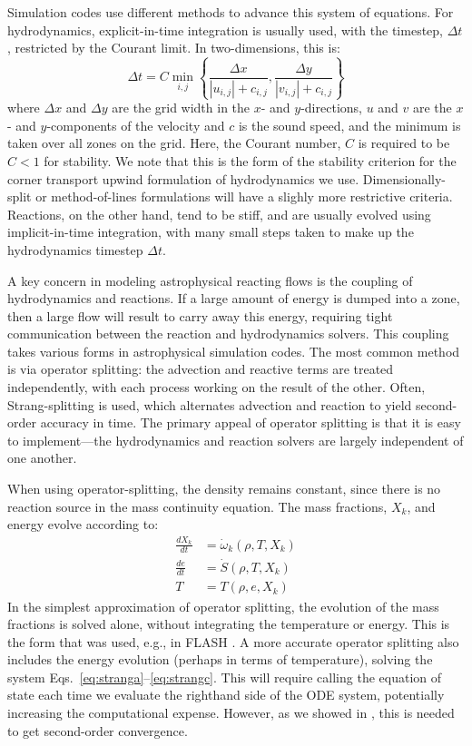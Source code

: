 \documentclass[modern]{aastex631}
\newcommand{\omegadot}{\dot{\omega}}
\begin{document}
Simulation codes use different methods to advance this system of equations.  For hydrodynamics,
explicit-in-time integration is usually used, with the timestep, $\Delta t$, restricted by the Courant limit.  In two-dimensions, this is:
\begin{equation}
\Delta t = C \min_{i,j} \left \{ \frac{\Delta x}{|u_{i,j}| + c_{i,j}}, \frac{\Delta y}{|v_{i,j}| + c_{i,j}}  \right \}
\end{equation}
where $\Delta x$ and $\Delta y$ are the grid width in the $x$- and $y$-directions, $u$ and $v$
are the $x$- and $y$-components of the velocity and $c$ is the sound
speed, and the minimum is taken over all zones on the grid.  Here, the
Courant number, $C$ is required to be $C < 1$ for stability.  We note that
this is the form of the stability criterion for the corner transport upwind
formulation \citep{ppmunsplit} of hydrodynamics we use.  Dimensionally-split
or method-of-lines formulations will have a slighly more restrictive criteria.
Reactions, on the other hand, tend to be stiff, and are usually evolved
using implicit-in-time integration, with many small steps taken to
make up the hydrodynamics timestep $\Delta t$.

A key concern in modeling astrophysical reacting flows is the coupling
of hydrodynamics and reactions.  If a large amount of energy is dumped
into a zone, then a large flow will result to carry away this energy,
requiring tight communication between the reaction and hydrodynamics
solvers.  This coupling takes various forms in astrophysical
simulation codes.  The most common method is via operator splitting:
the advection and reactive terms are treated independently, with each
process working on the result of the other.  Often, Strang-splitting
\citep{strang:1968} is used, which alternates advection and reaction
to yield second-order accuracy in time.  The primary appeal of operator
splitting is that it is easy to implement---the hydrodynamics and reaction
solvers are largely independent of one another.

When using operator-splitting, the density remains constant, since there
is no reaction source in the mass continuity equation.  The mass
fractions, $X_k$, and energy evolve according to:
\begin{eqnarray}
\frac{dX_k}{dt} &= \omegadot_k(\rho, T, X_k) \label{eq:stranga} \\
\frac{de}{dt} &= \dot{S}(\rho, T, X_k) \\
T &= T(\rho, e, X_k) \label{eq:strangc}
\end{eqnarray}
In the simplest approximation of operator splitting, the
evolution of the mass fractions is solved alone, without integrating
the temperature or energy.  This is the form that was used, e.g., in FLASH
\citep{flash}.  A more accurate operator splitting also includes the
energy evolution (perhaps in terms of temperature), solving the system Eqs.~\ref{eq:stranga}--\ref{eq:strangc}.  This will require
calling the equation of state each time we evaluate the righthand side
of the ODE system, potentially increasing the computational expense.  However, as we showed in
\citet{strang_rnaas}, this is needed to get second-order convergence.
\end{document}
